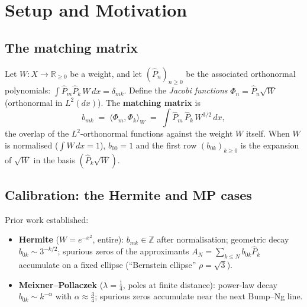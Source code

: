\documentclass[11pt,a4paper]{article}
\newcommand{\R}{\mathbb{R}}
\newcommand{\Z}{\mathbb{Z}}
\begin{document}
\begin{abstract}
\begin{enumerate}
\item \textbf{Bernstein zeros.} Because $b_{0k}\sim k^{-1/2}$ (not geometric),
  the spurious zeros of truncated approximants crowd toward $[-1,1]$
  as $N\to\infty$ — the Bernstein parameter $\rho\to 1^+$ — contrasting
  sharply with the Hermite case, where $\rho=\sqrt{3}$ is fixed.
\end{enumerate}

This family completes the \emph{weight triptych}: entire (Hermite), pole
at finite distance (Meixner--Pollaczek), and pure endpoint singularity (Jacobi).
\end{abstract}

\section{Setup and Motivation}

\subsection{The matching matrix}

Let $W\colon X\to\R_{\ge0}$ be a weight, and let $(\widehat P_n)_{n\ge0}$ be
the associated orthonormal polynomials: $\int \widehat P_m\widehat P_k\,W\,dx=\delta_{mk}$.
Define the \emph{Jacobi functions} $\Phi_n=\widehat P_n\sqrt{W}$
(orthonormal in $L^2(dx)$).
The \textbf{matching matrix} is
\[
  b_{mk} \;=\; \langle \Phi_m,\Phi_k\rangle_W \;=\; \int \widehat P_m\,\widehat P_k\,W^{3/2}\,dx,
\]
the overlap of the $L^2$-orthonormal functions against the weight $W$ itself.
When $W$ is normalised ($\int W\,dx=1$), $b_{00}=1$ and the first row
$(b_{0k})_{k\ge0}$ is the expansion of $\sqrt{W}$ in the basis $(\widehat P_k\sqrt{W})$.

\subsection{Calibration: the Hermite and MP cases}

Prior work \cite{HermiteRef,MPRef} established:
\begin{itemize}
\item \textbf{Hermite} ($W=e^{-x^2}$, entire): $b_{mk}\in\Z$ after
  normalisation; geometric decay $b_{0k}\sim 3^{-k/2}$; spurious zeros of
  the approximants $A_N=\sum_{k\le N}b_{0k}\widehat P_k$ accumulate on a
  fixed ellipse (``Bernstein ellipse'' $\rho=\sqrt{3}$).

\item \textbf{Meixner--Pollaczek} ($\lambda=\tfrac14$, poles at finite
  distance): power-law decay $b_{0k}\sim k^{-\alpha}$ with $\alpha\approx\tfrac34$;
  spurious zeros accumulate near the next Bump--Ng line.
\end{itemize}
\end{document}
